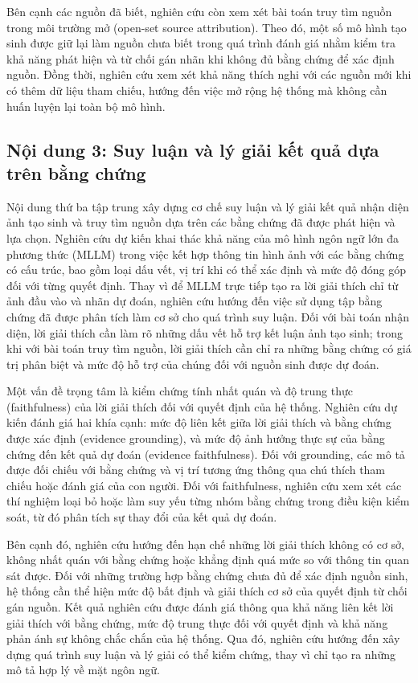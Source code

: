 \documentclass[12pt]{report}
\begin{document}
Bên cạnh các nguồn đã biết, nghiên cứu còn xem xét bài toán truy tìm nguồn trong môi trường mở (open-set source attribution). Theo đó, một số mô hình tạo sinh được giữ lại làm nguồn chưa biết trong quá trình đánh giá nhằm kiểm tra khả năng phát hiện và từ chối gán nhãn khi không đủ bằng chứng để xác định nguồn. Đồng thời, nghiên cứu xem xét khả năng thích nghi với các nguồn mới khi có thêm dữ liệu tham chiếu, hướng đến việc mở rộng hệ thống mà không cần huấn luyện lại toàn bộ mô hình.

\subsection{Nội dung 3: Suy luận và lý giải kết quả dựa trên bằng chứng}

Nội dung thứ ba tập trung xây dựng cơ chế suy luận và lý giải kết quả nhận diện ảnh tạo sinh và truy tìm nguồn dựa trên các bằng chứng đã được phát hiện và lựa chọn. Nghiên cứu dự kiến khai thác khả năng của mô hình ngôn ngữ lớn đa phương thức (MLLM) trong việc kết hợp thông tin hình ảnh với các bằng chứng có cấu trúc, bao gồm loại dấu vết, vị trí khi có thể xác định và mức độ đóng góp đối với từng quyết định. Thay vì để MLLM trực tiếp tạo ra lời giải thích chỉ từ ảnh đầu vào và nhãn dự đoán, nghiên cứu hướng đến việc sử dụng tập bằng chứng đã được phân tích làm cơ sở cho quá trình suy luận. Đối với bài toán nhận diện, lời giải thích cần làm rõ những dấu vết hỗ trợ kết luận ảnh tạo sinh; trong khi với bài toán truy tìm nguồn, lời giải thích cần chỉ ra những bằng chứng có giá trị phân biệt và mức độ hỗ trợ của chúng đối với nguồn sinh được dự đoán.

Một vấn đề trọng tâm là kiểm chứng tính nhất quán và độ trung thực (faithfulness) của lời giải thích đối với quyết định của hệ thống. Nghiên cứu dự kiến đánh giá hai khía cạnh: mức độ liên kết giữa lời giải thích và bằng chứng được xác định (evidence grounding), và mức độ ảnh hưởng thực sự của bằng chứng đến kết quả dự đoán (evidence faithfulness). Đối với grounding, các mô tả được đối chiếu với bằng chứng và vị trí tương ứng thông qua chú thích tham chiếu hoặc đánh giá của con người. Đối với faithfulness, nghiên cứu xem xét các thí nghiệm loại bỏ hoặc làm suy yếu từng nhóm bằng chứng trong điều kiện kiểm soát, từ đó phân tích sự thay đổi của kết quả dự đoán.

Bên cạnh đó, nghiên cứu hướng đến hạn chế những lời giải thích không có cơ sở, không nhất quán với bằng chứng hoặc khẳng định quá mức so với thông tin quan sát được. Đối với những trường hợp bằng chứng chưa đủ để xác định nguồn sinh, hệ thống cần thể hiện mức độ bất định và giải thích cơ sở của quyết định từ chối gán nguồn. Kết quả nghiên cứu được đánh giá thông qua khả năng liên kết lời giải thích với bằng chứng, mức độ trung thực đối với quyết định và khả năng phản ánh sự không chắc chắn của hệ thống. Qua đó, nghiên cứu hướng đến xây dựng quá trình suy luận và lý giải có thể kiểm chứng, thay vì chỉ tạo ra những mô tả hợp lý về mặt ngôn ngữ.
\end{document}
